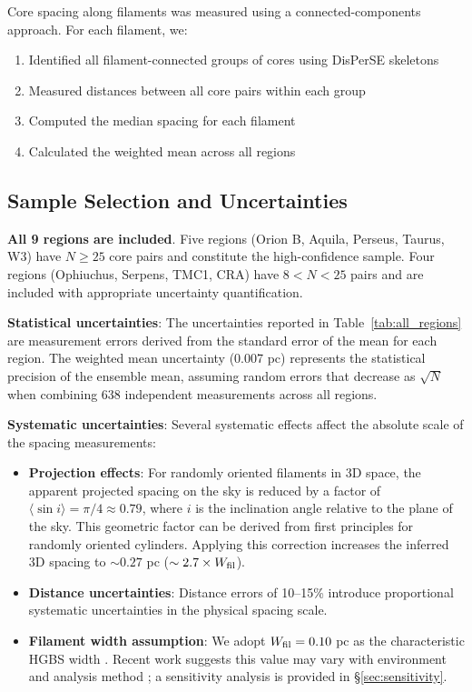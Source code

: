 \documentclass[11pt,a4paper]{article}
\begin{document}
Core spacing along filaments was measured using a connected-components approach. For each filament, we:
\begin{enumerate}
    \item Identified all filament-connected groups of cores using DisPerSE skeletons
    \item Measured distances between all core pairs within each group
    \item Computed the median spacing for each filament
    \item Calculated the weighted mean across all regions
\end{enumerate}

\subsection{Sample Selection and Uncertainties}

\textbf{All 9 regions are included}. Five regions (Orion B, Aquila, Perseus, Taurus, W3) have $N \geq 25$ core pairs and constitute the high-confidence sample. Four regions (Ophiuchus, Serpens, TMC1, CRA) have $8 < N < 25$ pairs and are included with appropriate uncertainty quantification.

\textbf{Statistical uncertainties}: The uncertainties reported in Table~\ref{tab:all_regions} are measurement errors derived from the standard error of the mean for each region. The weighted mean uncertainty (0.007 pc) represents the statistical precision of the ensemble mean, assuming random errors that decrease as $\sqrt{N}$ when combining 638 independent measurements across all regions.

\textbf{Systematic uncertainties}: Several systematic effects affect the absolute scale of the spacing measurements:
\begin{itemize}
    \item \textbf{Projection effects}: For randomly oriented filaments in 3D space, the apparent projected spacing on the sky is reduced by a factor of $\langle \sin i \rangle = \pi/4 \approx 0.79$, where $i$ is the inclination angle relative to the plane of the sky. This geometric factor can be derived from first principles for randomly oriented cylinders. Applying this correction increases the inferred 3D spacing to $\sim0.27$ pc ($\sim2.7\times W_{\rm fil}$).
    \item \textbf{Distance uncertainties}: Distance errors of 10--15\% introduce proportional systematic uncertainties in the physical spacing scale.
    \item \textbf{Filament width assumption}: We adopt $W_{\rm fil} = 0.10$ pc as the characteristic HGBS width \citep{Arzoumanian2011}. Recent work suggests this value may vary with environment and analysis method \citep{Panopoulou2022, Hacar2023}; a sensitivity analysis is provided in \S\ref{sec:sensitivity}.
\end{itemize}
\end{document}

